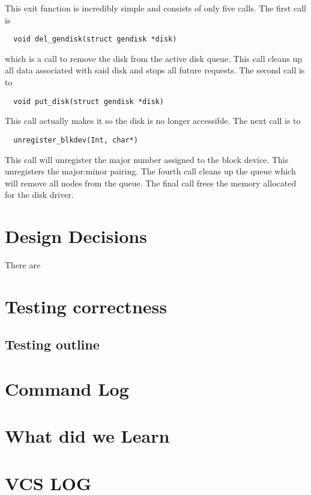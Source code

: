 \documentclass[onecolumn, draftclsnofoot,10pt, compsoc]{IEEEtran}
\begin{document}
    This exit function is incredibly simple and consists of only five calls. The first call is \begin{verbatim}  void del_gendisk(struct gendisk *disk) \end{verbatim} which is a call to remove the disk from the active disk queue. This call cleans up all data associated with said disk and stops all future requests. The second call is to \begin{verbatim}  void put_disk(struct gendisk *disk) \end{verbatim} This call actually makes it so the disk is no longer accessible. The next call is to \begin{verbatim}  unregister_blkdev(Int, char*) \end{verbatim} This call will unregister the major number assigned to the block device. This unregisters the major:minor pairing. The fourth call cleans up the queue which will remove all nodes from the queue. The final call frees the memory allocated for the disk driver.

	\section{Design Decisions}
    
    There are 

	\section{Testing correctness}

	\subsection{Testing outline}

	\section{Command Log}

	\section{What did we Learn}

	\section{VCS LOG}

        
\end{document}

